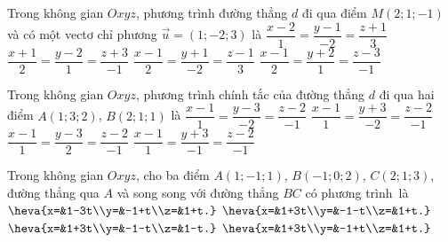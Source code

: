 \begin{ex}%
	Trong không gian $Oxyz$, phương trình đường thẳng $d$ đi qua điểm $M(2;1;-1)$ và có  một vectơ chỉ phương $\overrightarrow{u} = (1;-2;3)$ là
	 \choice
		{\True  $\dfrac{x - 2}{1} = \dfrac{y - 1}{-2} = \dfrac{z + 1}{3}$}
		{$\dfrac{x + 1}{2} = \dfrac{y - 2}{1} = \dfrac{z + 3}{-1}$} 
		{$\dfrac{x - 1}{2} = \dfrac{y  + 1}{-2} = \dfrac{z - 1}{3}$}
		{$\dfrac{x - 1}{2} = \dfrac{y + 2}{1}  = \dfrac{z - 3}{-1}$}
\end{ex}

\begin{ex}%
	Trong không gian $Oxyz$,  phương trình chính tắc của đường thẳng $d$ đi qua hai điểm $A(1;3;2)$, $B(2;1;1)$ là
	\choice 
		{\True $\dfrac{x-1}{1}=\dfrac{y-3}{-2}=\dfrac{z-2}{-1}$} 
		{$\dfrac{x-1}{1}=\dfrac{y+3}{-2}=\dfrac{z-2}{-1}$} 
		{$\dfrac{x-1}{1}=\dfrac{y-3}{2}=\dfrac{z-2}{-1}$} 
		 {$\dfrac{x-1}{1}=\dfrac{y+3}{-1}=\dfrac{z-2}{-1}$}
\end{ex}

\begin{ex}%
	Trong không  gian $ Oxyz$, cho ba điểm $ A\left(1;-1;1\right)$, $B\left(-1;0;2\right)$, $C\left(2;1;3\right)$, đường thẳng qua $ A$ và song song với đường thẳng $BC$ có phương trình~là
	\renewcommand{\dotEX}{} 
	 \choice
		 {$\heva{x=&1-3t\\y=&-1+t\\z=&1+t.}$}
		{$\heva{x=&1+3t\\y=&-1-t\\z=&1+t.}$} 
		{$\heva{x=&1+3t\\y=&-1-t\\z=&1-t.}$} 
		{\True $\heva{x=&1+3t\\y=&-1+t\\z=&1+t.}$} 
\end{ex}

